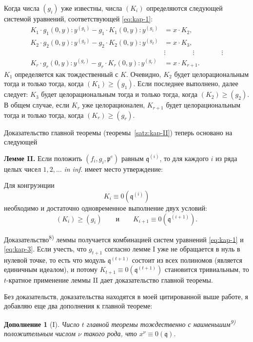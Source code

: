 \documentclass[11pt]{article}
\theoremstyle{plain}
\newtheorem{zusatz}{Дополнение}
\begin{document}
Когда числа $(g_{i})$ уже известны, числа $(K_{i})$ определяются
следующей системой уравнений, соответствующей \eqref{eq:kap-1}:
\begin{equation}\label{eq:kap-3}
\begin{aligned}
K_{1}\cdot g_{1}(0,y):y^{(g_{1})} - g_{1}\cdot K_{1}(0,y):y^{(g_{1})} &= x\cdot K_{2},\\
K_{2}\cdot g_{2}(0,y):y^{(g_{2})} - g_{2}\cdot K_{2}(0,y):y^{(g_{2})} &= x\cdot K_{3},\\
&\vdots \qquad\qquad\vdots\qquad\qquad\vdots\\
K_{r}\cdot g_{r}(0,y):y^{(g_{r})} - g_{r}\cdot K_{r}(0,y):y^{(g_{r})} &= x\cdot K_{r+1}.
\end{aligned}
\end{equation}
$K_{1}$ определяется как тождественный с $K$. Очевидно, $K_{2}$ будет
целорациональным тогда и только тогда, когда $(K_{1}) \geq (g_{1})$.
Если последнее выполнено, далее следует: $K_{3}$ будет
целорациональным тогда и только тогда, когда $(K_{2}) \geq (g_{2})$.
В общем случае, если $K_{r}$ уже целорационален, $K_{r+1}$ будет
целорациональным тогда и только тогда, когда $(K_{r}) \geq (g_{r})$.

Доказательство главной теоремы (теоремы~\ref{satz:kap-II}) теперь
основано на следующей

\smallskip
\textbf{Лемме II.} Если положить
$(f_{i}, g_{i}, \mathfrak{p}^{e})$ равным $\mathfrak{q}^{(i)}$, то для
каждого $i$ из ряда целых чисел $1, 2, \ldots$ \textit{in inf.}
имеет место утверждение:

Для конгруэнции
\[
K_{i} \equiv 0(\mathfrak{q}^{(i)})
\]
необходимо и достаточно одновременное выполнение двух условий:
\[
(K_{i}) \geq (g_{i}) \qquad \text{и} \qquad K_{i+1} \equiv 0(\mathfrak{q}^{(i+1)}).
\]

Доказательство\textsuperscript{8)} леммы получается комбинацией
систем уравнений \eqref{eq:kap-1} и \eqref{eq:kap-3}. Если учесть,
что $g_{t+1}$ согласно лемме I уже не обращается в нуль в нулевой
точке, то есть что модуль $\mathfrak{q}^{(t+1)}$ состоит из всех
полиномов (является единичным идеалом), и потому
$K_{t+1} \equiv 0(\mathfrak{q}^{(t+1)})$ становится тривиальным, то
$t$-кратное применение леммы II дает доказательство главной
теоремы.

\smallskip
Без доказательств, доказательства находятся в моей цитированной
выше работе, я добавляю еще два дополнения к главной теореме:

\begin{zusatz}[I]
Число $t$ главной теоремы тождественно с наименьшим\textsuperscript{9)}
положительным числом $\nu$ такого рода, что
$x^{\nu} \equiv 0(\mathfrak{q})$.
\end{zusatz}
\end{document}
